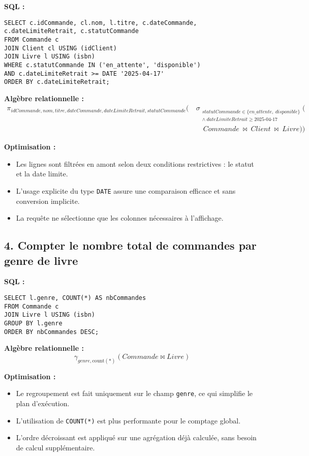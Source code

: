 \documentclass{article}
\begin{document}
\textbf{SQL :}
\begin{lstlisting}
SELECT c.idCommande, cl.nom, l.titre, c.dateCommande, c.dateLimiteRetrait, c.statutCommande
FROM Commande c
JOIN Client cl USING (idClient)
JOIN Livre l USING (isbn)
WHERE c.statutCommande IN ('en_attente', 'disponible')
AND c.dateLimiteRetrait >= DATE '2025-04-17'
ORDER BY c.dateLimiteRetrait;
\end{lstlisting}

\textbf{Algèbre relationnelle :}
\begin{align*}
  \pi_{idCommande, nom, titre, dateCommande, dateLimiteRetrait, statutCommande} \Big( \ 
    &\sigma_{\substack{
      statutCommande \in \{en\_attente,\ disponible\} \\
      \land\ dateLimiteRetrait \geq 2025\text{-}04\text{-}17
    }} \Big( \\
    &\hspace{1em} Commande \ \bowtie\ Client \ \bowtie\ Livre \Big) \Big)
\end{align*}

\textbf{Optimisation :}
\begin{itemize}
  \item Les lignes sont filtrées en amont selon deux conditions restrictives : le statut et la date limite.
  \item L’usage explicite du type \texttt{DATE} assure une comparaison efficace et sans conversion implicite.
  \item La requête ne sélectionne que les colonnes nécessaires à l’affichage.
\end{itemize}

\bigskip

\subsection*{4. Compter le nombre total de commandes par genre de livre}

\textbf{SQL :}
\begin{lstlisting}
SELECT l.genre, COUNT(*) AS nbCommandes
FROM Commande c
JOIN Livre l USING (isbn)
GROUP BY l.genre
ORDER BY nbCommandes DESC;
\end{lstlisting}

\textbf{Algèbre relationnelle :}
\[
\gamma_{genre, \text{count}(*)}(Commande \bowtie Livre)
\]

\textbf{Optimisation :}
\begin{itemize}
  \item Le regroupement est fait uniquement sur le champ \texttt{genre}, ce qui simplifie le plan d’exécution.
  \item L’utilisation de \texttt{COUNT(*)} est plus performante pour le comptage global.
  \item L’ordre décroissant est appliqué sur une agrégation déjà calculée, sans besoin de calcul supplémentaire.
\end{itemize}
\end{document}
